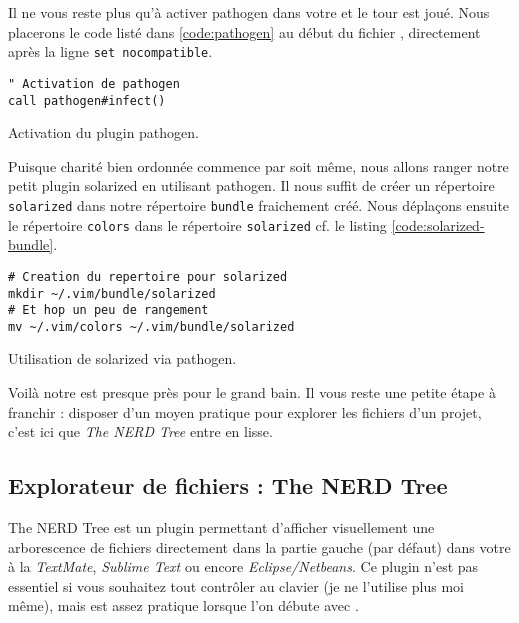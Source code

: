 Il ne vous reste plus qu'à activer pathogen dans votre \vimrc et le tour est joué. Nous placerons le code listé dans 
\ref{code:pathogen} au début du fichier \vimrc, directement après la ligne \Verb|set nocompatible|.

\begin{listing}[H]

\begin{verbatim}
" Activation de pathogen
call pathogen#infect()
\end{verbatim}
\caption{Activation du plugin pathogen.}
\label{code:pathogen}
\end{listing}

Puisque charité bien ordonnée commence par soit même, nous allons ranger notre petit plugin solarized en utilisant pathogen. Il nous suffit de créer un répertoire \Verb|solarized| dans notre répertoire \Verb|bundle| fraichement créé. Nous déplaçons ensuite le répertoire \Verb|colors| dans le répertoire \Verb|solarized| cf. le listing \ref{code:solarized-bundle}.

\begin{listing}[H]
\begin{verbatim}
# Creation du repertoire pour solarized
mkdir ~/.vim/bundle/solarized
# Et hop un peu de rangement
mv ~/.vim/colors ~/.vim/bundle/solarized
\end{verbatim}
  \caption{Utilisation de solarized via pathogen.}
  \label{code:solarized-bundle}
\end{listing}

Voilà notre \vim est presque près pour le grand bain. Il vous reste une petite étape à franchir : disposer d'un moyen pratique pour explorer les fichiers d'un projet, c'est ici que \emph{The NERD Tree} entre en lisse.

\subsection{Explorateur de fichiers : The NERD Tree}

The NERD Tree est un plugin permettant d'afficher visuellement une arborescence de fichiers directement dans la partie gauche (par défaut) dans votre \vim à la \emph{TextMate}, \emph{Sublime Text} ou encore \emph{Eclipse/Netbeans}. Ce plugin n'est pas essentiel si vous souhaitez tout contrôler au clavier (je ne l'utilise plus moi même), mais est assez pratique lorsque l'on débute avec \vim.


